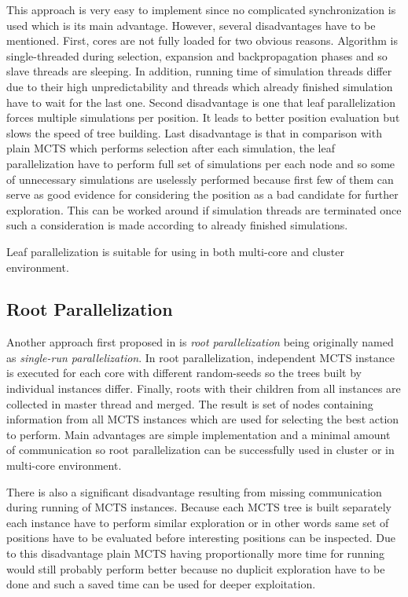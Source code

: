 This approach is very easy to implement since no complicated synchronization is used
which is its main advantage. However, several disadvantages have to be mentioned. First, cores are
not fully loaded for two obvious reasons. Algorithm is single-threaded during selection, expansion
and backpropagation phases and so slave threads are sleeping. In addition, running time of
simulation threads differ due to their high unpredictability and threads which already finished
simulation have to wait for the last one. Second disadvantage is one that leaf parallelization
forces multiple simulations
per position. It leads to better position evaluation but slows the speed of tree building. Last
disadvantage is that in comparison with plain MCTS which performs selection after each simulation,
the leaf parallelization have to perform full set of simulations per each node and so some of
unnecessary simulations are uselessly performed because first few of them can serve as good evidence
for considering the position as a bad candidate for further exploration. This can be worked around
if simulation threads are terminated once such a consideration is made according to already finished
simulations.

Leaf parallelization is suitable for using in both multi-core and cluster environment.


\subsection{Root Parallelization}
\label{sec_root_parallelization}


Another approach first proposed in \cite{Cazenave2007} is \emph{root parallelization} being
originally named as \emph{single-run parallelization}. In root parallelization, independent
MCTS instance is executed for each core with different random-seeds so the trees built by individual
instances differ. Finally, roots with their children from all instances are collected in master
thread and merged. The result is set of nodes containing information from all MCTS instances which
are used for selecting the best action to perform. Main advantages are simple implementation and a
minimal amount of communication so root parallelization can be successfully used in cluster
or in multi-core environment.

There is also a significant disadvantage resulting from missing communication during running of MCTS
instances. Because each MCTS tree is built separately each instance have to perform similar
exploration or in other words same set of positions have to be evaluated before interesting
positions can be inspected. Due to this disadvantage plain MCTS having proportionally more time for
running would still probably perform better because no duplicit exploration have to be done and such
a saved time can be used for deeper exploitation.

